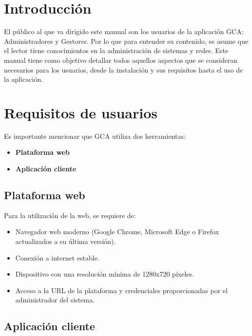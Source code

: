 
\section{Introducción}

El público al que va dirigido este manual son los usuarios de la aplicación GCA: Administradores y Gestores.
Por lo que para entender su contenido, se asume que el lector tiene conocimientos en la administración de sistemas y
redes.
Este manual tiene como objetivo detallar todos aquellos aspectos que se consideran necesarios para los usuarios,
desde la instalación y sus requisitos hasta el uso de la aplicación.

\section{Requisitos de usuarios}

Es importante mencionar que GCA utiliza dos herramientas:
\begin{itemize}
    \item \textbf{Plataforma web}
    \item \textbf{Aplicación cliente}
\end{itemize}

\subsection{Plataforma web}

Para la utilización de la web, se requiere de:
\begin{itemize}
    \item Navegador web moderno (Google Chrome, Microsoft Edge o Firefox actualizados a su última versión).
    \item Conexión a internet estable.
    \item Dispositivo con una resolución mínima de 1280x720 píxeles.
    \item Acceso a la URL de la plataforma y credenciales proporcionadas por el administrador del sistema.
\end{itemize}

\subsection{Aplicación cliente}

